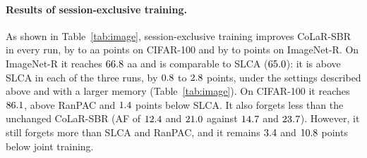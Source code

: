 \begin{table}[!htbp]
  \centering
  \caption[Ablation of session-exclusive training on images]{\textbf{Ablation of
  session-exclusive training} (mean $\pm$ s.d.\ of three runs; rows~II and~III: one run;
  row~I: CoLaR-SBR unchanged). $^{u}$Not reported: the late sessions are not learned, so
  there is nothing to forget.}
  \label{tab:image-ablation}
  
\end{table}

\paragraph{Results of session-exclusive training.} As shown in Table~\ref{tab:image},
session-exclusive training improves CoLaR-SBR in every run, by \imgSbrXMinusSbrCifarMin{} to
\imgSbrXMinusSbrCifarMax{} \gls{aa} points on CIFAR-100 and by \imgSbrXMinusSbrImnrMin{} to
\imgSbrXMinusSbrImnrMax{} points on ImageNet-R. On ImageNet-R it reaches $66.8$
\gls{aa} and is comparable to SLCA ($65.0$): it is above SLCA in each of the three
runs, by $0.8$ to $2.8$ points, under the
settings described above and with a larger memory (Table~\ref{tab:image}). On
CIFAR-100 it reaches $86.1$, above RanPAC and $1.4$ points below
SLCA. It also forgets less than the unchanged CoLaR-SBR (AF of $12.4$ and
$21.0$ against $14.7$ and $23.7$). However, it still forgets
more than SLCA and RanPAC, and it remains $3.4$ and
$10.8$ points below joint training.

